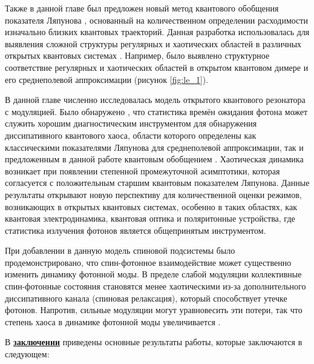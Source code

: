 Также в данной главе был предложен новый метод квантового обобщения показателя Ляпунова \cite{Yusipov2019_2}, основанный на количественном определении расходимости изначально близких квантовых траекторий.
Данная разработка использовалась для выявления сложной структуры регулярных и хаотических областей в различных открытых квантовых системах \cite{Yusipov2019_2, Yusipov2020, Yusipov2021}. Например, было выявлено структурное соответствие регулярных и хаотических областей в открытом квантовом димере и его среднеполевой аппроксимации (рисунок \cref{fig:le_1}).

В данной главе численно исследовалась модель открытого квантового резонатора с модуляцией. 
Было обнаружено \cite{Yusipov2020}, что статистика времён ожидания фотона может служить хорошим диагностическим инструментом для обнаружения диссипативного квантового хаоса, области которого определены как классическими показателями Ляпунова для среднеполевой аппроксимации, так и предложенным в данной работе квантовым обобщением \cite{Yusipov2019_2}.
Хаотическая динамика возникает при появлении степенной промежуточной асимптотики, которая согласуется с положительным старшим квантовым показателем Ляпунова.
Данные результаты открывают новую перспективу для количественной оценки режимов, возникающих в открытых квантовых системах, особенно в таких областях, как квантовая электродинамика, квантовая оптика и поляритонные устройства, где статистика излучения фотонов является общепринятым инструментом. 

При добавлении в данную модель спиновой подсистемы было продемонстрировано, что спин-фотонное взаимодействие может существенно изменить динамику фотонной моды. 
В пределе слабой модуляции коллективные спин-фотонные состояния становятся менее хаотическими из-за дополнительного диссипативного канала (спиновая релаксация), который способствует утечке фотонов. 
Напротив, сильные модуляции могут уравновесить эти потери, так что степень хаоса в динамике фотонной моды увеличивается \cite{Yusipov2021}.

\FloatBarrier
{}                                  %
В \underline{\textbf{заключении}} приведены основные результаты работы, которые заключаются в следующем:



